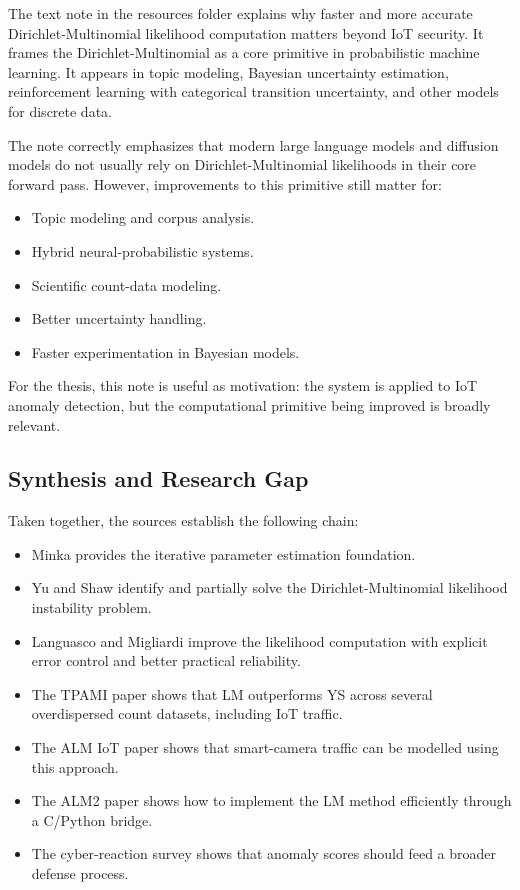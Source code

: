 \documentclass[11pt,a4paper]{article}
\begin{document}
The text note in the resources folder explains why faster and more accurate Dirichlet-Multinomial likelihood computation matters beyond IoT security. It frames the Dirichlet-Multinomial as a core primitive in probabilistic machine learning. It appears in topic modeling, Bayesian uncertainty estimation, reinforcement learning with categorical transition uncertainty, and other models for discrete data.

The note correctly emphasizes that modern large language models and diffusion models do not usually rely on Dirichlet-Multinomial likelihoods in their core forward pass. However, improvements to this primitive still matter for:

\begin{itemize}
  \item Topic modeling and corpus analysis.
  \item Hybrid neural-probabilistic systems.
  \item Scientific count-data modeling.
  \item Better uncertainty handling.
  \item Faster experimentation in Bayesian models.
\end{itemize}

For the thesis, this note is useful as motivation: the system is applied to IoT anomaly detection, but the computational primitive being improved is broadly relevant.

\subsection{Synthesis and Research Gap}

Taken together, the sources establish the following chain:

\begin{itemize}
  \item Minka provides the iterative parameter estimation foundation.
  \item Yu and Shaw identify and partially solve the Dirichlet-Multinomial likelihood instability problem.
  \item Languasco and Migliardi improve the likelihood computation with explicit error control and better practical reliability.
  \item The TPAMI paper shows that LM outperforms YS across several overdispersed count datasets, including IoT traffic.
  \item The ALM IoT paper shows that smart-camera traffic can be modelled using this approach.
  \item The ALM2 paper shows how to implement the LM method efficiently through a C/Python bridge.
  \item The cyber-reaction survey shows that anomaly scores should feed a broader defense process.
\end{itemize}
\end{document}
